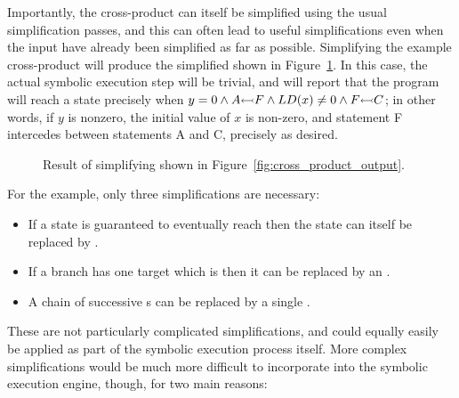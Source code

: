 
Importantly, the cross-product {\StateMachine} can itself be
simplified using the usual {\StateMachine} simplification passes, and
this can often lead to useful simplifications even when the input
{\StateMachines} have already been simplified as far as possible.
Simplifying the example cross-product {\StateMachine} will produce the
simplified {\StateMachine} shown in
Figure~\ref{fig:cross_product_output_opt}.  In this case, the actual
symbolic execution step will be trivial, and will report that the
program will reach a  state precisely when $y = 0 \wedge
A {\leftarrowtail} F \wedge LD(x) \not= 0 \wedge
F {\leftarrowtail} C$; in other words, if $y$ is nonzero, the initial
value of $x$ is non-zero, and statement F intercedes between
statements A and C, precisely as desired.

\begin{figure}
  \caption{Result of simplifying {\StateMachine} shown in
    Figure~\ref{fig:cross_product_output}.}
  \label{fig:cross_product_output_opt}
\end{figure}

For the example, only three simplifications are necessary:

\begin{itemize}
\item If a state is guaranteed to eventually reach 
  then the state can itself be replaced by .
\item If a branch has one target which is  then
  it can be replaced by an .
\item A chain of successive s can be replaced by a
  single .
\end{itemize}

These are not particularly complicated simplifications, and could
equally easily be applied as part of the symbolic execution process
itself.  More complex simplifications would be much more difficult to
incorporate into the symbolic execution engine, though, for two main
reasons:


